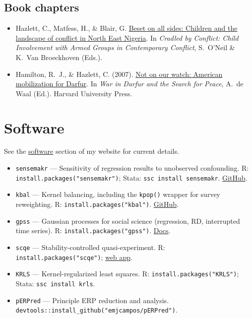 \documentclass[11pt]{article}
\newcommand{\pubitem}[1]{\item #1}
\begin{document}
\subsection{Book chapters}
\begin{itemize}
\pubitem{Hazlett, C., Matfess, H., \& Blair, G. \href{https://chadhazlett.com/publications.html#matfess_blair_hazlett_beset_nigeria}{Beset on all sides: Children and the landscape of conflict in North East Nigeria}. In \emph{Cradled by Conflict: Child Involvement with Armed Groups in Contemporary Conflict}, S.~O'Neil \& K.~Van Broeckhoven (Eds.).}

\pubitem{Hamilton, R.~J., \& Hazlett, C. (2007). \href{https://chadhazlett.com/publications.html#hamilton_hazlett_2007_darfur}{Not on our watch: American mobilization for Darfur}. In \emph{War in Darfur and the Search for Peace}, A.~de Waal (Ed.). Harvard University Press.}
\end{itemize}

\section{Software}
See the \href{https://chadhazlett.com/software.html}{software} section of my website for current details.
\begin{itemize}
\item \texttt{sensemakr} --- Sensitivity of regression results to unobserved confounding. R: \texttt{install.packages("sensemakr")}; Stata: \texttt{ssc install sensemakr}. \href{https://github.com/carloscinelli/sensemakr}{GitHub}.
\item \texttt{kbal} --- Kernel balancing, including the \texttt{kpop()} wrapper for survey reweighting. R: \texttt{install.packages("kbal")}. \href{https://github.com/chadhazlett/KBAL}{GitHub}.
\item \texttt{gpss} --- Gaussian processes for social science (regression, RD, interrupted time series). R: \texttt{install.packages("gpss")}. \href{https://doeunkim.org/gpss/}{Docs}.
\item \texttt{scqe} --- Stability-controlled quasi-experiment. R: \texttt{install.packages("scqe")}; \href{https://amiwulf.shinyapps.io/SCQE_demo/}{web app}.
\item \texttt{KRLS} --- Kernel-regularized least squares. R: \texttt{install.packages("KRLS")}; Stata: \texttt{ssc install krls}.
\item \texttt{pERPred} --- Principle ERP reduction and analysis. \texttt{devtools::install\_github("emjcampos/pERPred")}.
\end{itemize}
\end{document}
